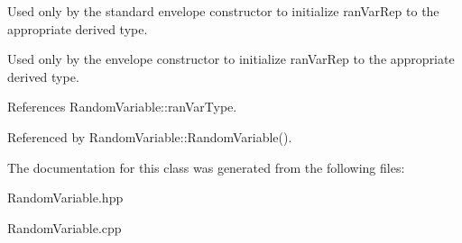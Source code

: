 Used only by the standard envelope constructor to initialize ran\+Var\+Rep to the appropriate derived type. 

Used only by the envelope constructor to initialize ran\+Var\+Rep to the appropriate derived type. 

References Random\+Variable\+::ran\+Var\+Type.



Referenced by Random\+Variable\+::\+Random\+Variable().



The documentation for this class was generated from the following files\+:\begin{DoxyCompactItemize}
\item 
Random\+Variable.\+hpp\item 
Random\+Variable.\+cpp\end{DoxyCompactItemize}
